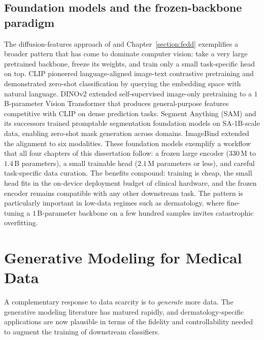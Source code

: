 \documentclass[11pt]{ucthesis}
\begin{document}
\subsection{Foundation models and the frozen-backbone paradigm}

The diffusion-features approach of \cite{baranchuk_2022_labelefficient} and Chapter~\ref{section:fedd} exemplifies a broader pattern that has come to dominate computer vision: take a very large pretrained backbone, freeze its weights, and train only a small task-specific head on top. CLIP \cite{Radford2021LearningTV} pioneered language-aligned image-text contrastive pretraining and demonstrated zero-shot classification by querying the embedding space with natural language. DINOv2 \cite{oquab2023dinov2} extended self-supervised image-only pretraining to a $1$\,B-parameter Vision Transformer \cite{dosovitskiy-2020} that produces general-purpose features competitive with CLIP on dense prediction tasks. Segment Anything (SAM) \cite{Kirillov2023SegmentA} and its successors trained promptable segmentation foundation models on SA-1B-scale data, enabling zero-shot mask generation across domains. ImageBind \cite{Girdhar2023ImageBindOE} extended the alignment to six modalities. These foundation models exemplify a workflow that all four chapters of this dissertation follow: a frozen large encoder ($330$\,M to $1.4$\,B parameters), a small trainable head ($2.1$\,M parameters or less), and careful task-specific data curation. The benefits compound: training is cheap, the small head fits in the on-device deployment budget of clinical hardware, and the frozen encoder remains compatible with any other downstream task. The pattern is particularly important in low-data regimes such as dermatology, where fine-tuning a $1$\,B-parameter backbone on a few hundred samples invites catastrophic overfitting.

\section{Generative Modeling for Medical Data}
\label{sec:bg_gen}

A complementary response to data scarcity is to \emph{generate} more data. The generative modeling literature has matured rapidly, and dermatology-specific applications are now plausible in terms of the fidelity and controllability needed to augment the training of downstream classifiers.
\end{document}
